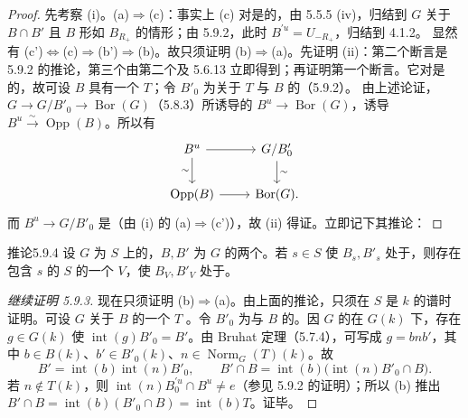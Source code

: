 \begin{proof}
先考察 (i)。(a)$\Rightarrow$(c)：事实上 (c) 对是的，由 5.5.5 (iv)，归结到 $G$ 关于 $B\cap B'$ 且 $B$ 形如 $B_{R_+}$ 的情形；由 5.9.2，此时 $B^{\prime u}=U_{-R_+}$，归结到 4.1.2。
显然有 (c')$\Leftrightarrow$(c)$\Rightarrow$(b')$\Rightarrow$(b)。故只须证明 (b)$\Rightarrow$(a)。先证明 (ii)：第二个断言是 5.9.2 的推论，第三个由第二个及 5.6.13 立即得到；再证明第一个断言。它对是的，故可设 $B$ 具有一个 $T$；令 $B'_0$ 为关于 $T$ 与 $B$ 的（5.9.2）。
由上述论证， $G\to G/B'_0\to\operatorname{Bor}(G)$（5.8.3）所诱导的 $B^u\to\operatorname{Bor}(G)$，诱导 $B^u\xrightarrow\sim\operatorname{Opp}(B)$。所以有
\[\begin{tikzcd}
B^u\arrow[r]\arrow[d,"\sim"']&G/B'_0\arrow[d,"\sim"]\\
\operatorname{Opp}(B)\arrow[r]&\operatorname{Bor}(G).
\end{tikzcd}\]
而 $B^u\to G/B'_0$ 是（由 (i) 的 (a)$\Rightarrow$(c')），故 (ii) 得证。立即记下其推论：
\end{proof}
\begin{SGAresult}{推论}{5.9.4}
设 $G$ 为 $S$ 上的，$B,B'$ 为 $G$ 的两个。若 $s\in S$ 使 $B_s,B'_s$ 处于，则存在包含 $s$ 的 $S$ 的一个 $V$，使 $B_V,B'_V$ 处于。
\end{SGAresult}
\begin{proof}[继续证明 5.9.3]
现在只须证明 (b)$\Rightarrow$(a)。由上面的推论，只须在 $S$ 是 $k$ 的谱时证明。可设 $G$ 关于 $B$ 的一个 $T$ 。令 $B'_0$ 为与 $B$ 的。因 $G$ 的在 $G(k)$ 下，存在 $g\in G(k)$ 使 $\operatorname{int}(g)B'_0=B'$。由 Bruhat 定理（5.7.4），可写成 $g=bnb'$，其中 $b\in B(k)$、$b'\in B'_0(k)$、$n\in\operatorname{Norm}_G(T)(k)$。故
\[B'=\operatorname{int}(b)\operatorname{int}(n)B'_0,\qquad
B'\cap B=\operatorname{int}(b)\bigl(\operatorname{int}(n)B'_0\cap B\bigr).\]
若 $n\notin T(k)$，则 $\operatorname{int}(n)B_0^{\prime u}\cap B^u\ne e$（参见 5.9.2 的证明）；所以 (b) 推出 $B'\cap B=\operatorname{int}(b)(B'_0\cap B)=\operatorname{int}(b)T$。证毕。
\end{proof}
